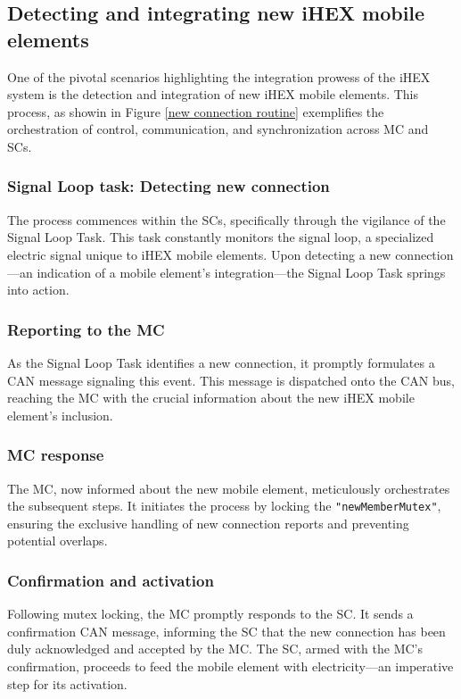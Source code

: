 \subsection{Detecting and integrating new iHEX mobile elements}

One of the pivotal scenarios highlighting the integration prowess of the iHEX system is the detection and integration of new iHEX mobile elements. This process, as showin in Figure \ref{new connection routine} exemplifies the orchestration of control, communication, and synchronization across MC and SCs.

\subsubsection{Signal Loop task: Detecting new connection}
The process commences within the SCs, specifically through the vigilance of the Signal Loop Task. This task constantly monitors the signal loop, a specialized electric signal unique to iHEX mobile elements. Upon detecting a new connection—an indication of a mobile element's integration—the Signal Loop Task springs into action.

\subsubsection{Reporting to the MC}
As the Signal Loop Task identifies a new connection, it promptly formulates a CAN message signaling this event. This message is dispatched onto the CAN bus, reaching the MC with the crucial information about the new iHEX mobile element's inclusion.

\subsubsection{MC response}
The MC, now informed about the new mobile element, meticulously orchestrates the subsequent steps. It initiates the process by locking the \texttt{"newMemberMutex"}, ensuring the exclusive handling of new connection reports and preventing potential overlaps.

\subsubsection{Confirmation and activation}
Following mutex locking, the MC promptly responds to the SC. It sends a confirmation CAN message, informing the SC that the new connection has been duly acknowledged and accepted by the MC. The SC, armed with the MC's confirmation, proceeds to feed the mobile element with electricity—an imperative step for its activation.


